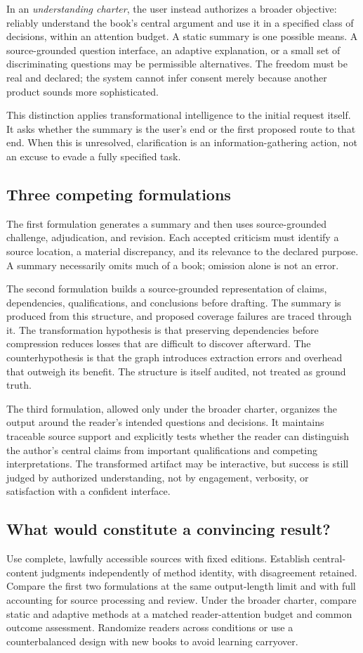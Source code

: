 \documentclass[11pt,letterpaper]{article}
\theoremstyle{remark}\newtheorem{remark}{Remark}[section]
\begin{document}
In an \emph{understanding charter}, the user instead authorizes a broader objective: reliably understand the book's central argument and use it in a specified class of decisions, within an attention budget. A static summary is one possible means. A source-grounded question interface, an adaptive explanation, or a small set of discriminating questions may be permissible alternatives. The freedom must be real and declared; the system cannot infer consent merely because another product sounds more sophisticated.

This distinction applies transformational intelligence to the initial request itself. It asks whether the summary is the user's end or the first proposed route to that end. When this is unresolved, clarification is an information-gathering action, not an excuse to evade a fully specified task.

\subsection{Three competing formulations}
The first formulation generates a summary and then uses source-grounded challenge, adjudication, and revision. Each accepted criticism must identify a source location, a material discrepancy, and its relevance to the declared purpose. A summary necessarily omits much of a book; omission alone is not an error.

The second formulation builds a source-grounded representation of claims, dependencies, qualifications, and conclusions before drafting. The summary is produced from this structure, and proposed coverage failures are traced through it. The transformation hypothesis is that preserving dependencies before compression reduces losses that are difficult to discover afterward. The counterhypothesis is that the graph introduces extraction errors and overhead that outweigh its benefit. The structure is itself audited, not treated as ground truth.

The third formulation, allowed only under the broader charter, organizes the output around the reader's intended questions and decisions. It maintains traceable source support and explicitly tests whether the reader can distinguish the author's central claims from important qualifications and competing interpretations. The transformed artifact may be interactive, but success is still judged by authorized understanding, not by engagement, verbosity, or satisfaction with a confident interface.

\subsection{What would constitute a convincing result?}
Use complete, lawfully accessible sources with fixed editions. Establish central-content judgments independently of method identity, with disagreement retained. Compare the first two formulations at the same output-length limit and with full accounting for source processing and review. Under the broader charter, compare static and adaptive methods at a matched reader-attention budget and common outcome assessment. Randomize readers across conditions or use a counterbalanced design with new books to avoid learning carryover.
\end{document}
